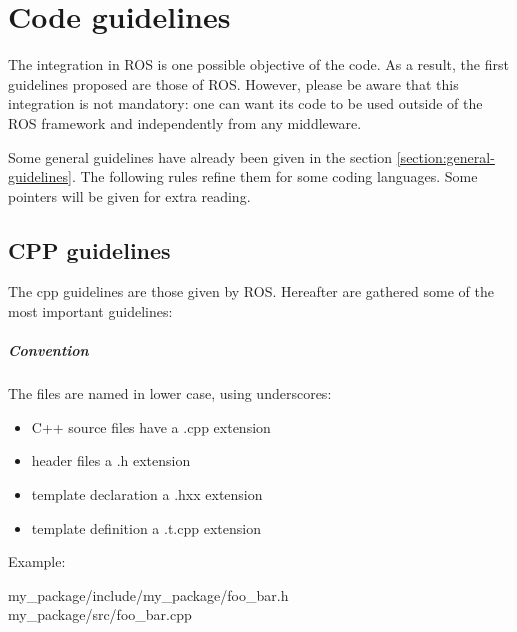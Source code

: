 \chapter{Code guidelines}


The integration in ROS is one possible objective of the code.
As a result,  the first guidelines proposed are those of ROS.
However, please be aware that this integration is not mandatory: one can want its code to be used outside of the ROS framework and independently from any middleware.


Some general guidelines have already been given in the section \ref{section:general-guidelines}. 
The following rules refine them for some coding languages.
Some pointers will be given for extra reading.


\section{CPP guidelines}

The cpp guidelines are those given by ROS.
Hereafter are gathered some of the most important guidelines:

\paragraph{Convention}
The files are named in lower case, using underscores:\\

\begin{itemize}
\item C++ source files have a .cpp extension
\item header files a .h extension
\item template declaration a .hxx extension 
\item template definition a .t.cpp extension
\end{itemize}
Example:\\
\begin{tt}
my\_package/include/my\_package/foo\_bar.h\\
my\_package/src/foo\_bar.cpp\\
\end{tt}


